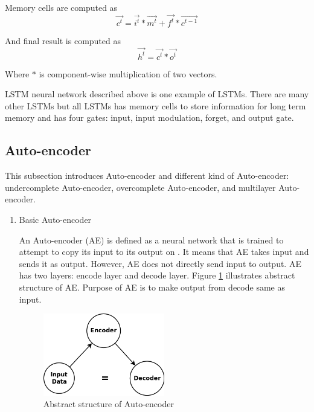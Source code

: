 \documentclass[draft,dvipsnames]{drexel-thesis}
\begin{document}
\begin{thesis}
\begin{enumerate}
		
	Memory cells are computed as
	$$\vec{c^t} = \vec{i^t} * \vec{m^t} + \vec{f^t} * \vec{c^{t-1}}$$
		
	And final result is computed as
	$$\vec{h^t} = \vec{c^t} * \vec{o^t}$$
		
	Where $*$ is component-wise multiplication of two vectors.
\end{enumerate}
	
	LSTM neural network described above is one example of LSTMs. There are many other LSTMs but all LSTMs has memory cells to store information for long term memory and has four gates: input, input modulation, forget, and output gate.



\subsection{Auto-encoder}\label{subsec:AE}

This subsection introduces Auto-encoder and different kind of Auto-encoder: undercomplete Auto-encoder, overcomplete Auto-encoder, and multilayer Auto-encoder.


\begin{enumerate}
\item Basic Auto-encoder

An Auto-encoder (AE) is defined as a neural network that is trained to attempt to copy its input to its output on \cite{Goodfellow-et-al-2016}. It means that AE takes input and sends it as output. However, AE does not directly send input to output. AE has two layers: encode layer and decode layer. Figure \ref{fig:AE} illustrates abstract structure of AE. Purpose of AE is to make output from decode same as input.

\begin{figure}[t!]
    \centering
    \includegraphics[width=0.5\textwidth]{pictures/figures/AE.png}
    \caption{Abstract structure of Auto-encoder}
    \label{fig:AE}
\end{figure}


\end{enumerate}
\end{thesis}
\end{document}
